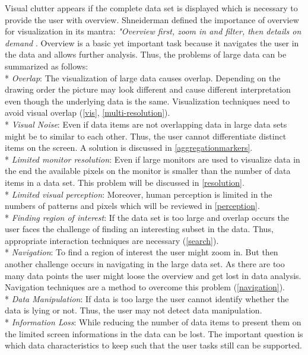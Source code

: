  Visual clutter appears if the complete data set is displayed which is necessary to provide the user with overview. Shneiderman defined the importance of overview for visualization in its mantra: \textit{"Overview first, zoom in and filter, then details on demand} \cite{paterno1997concurtasktrees, Shneiderman2008, Keim2008}. Overview is a basic yet important task because it navigates the user in the data and allows further analysis. Thus, the problems of large data can be summarized as follows: 
\\*
\textit{Overlap}: 
The visualization of large data causes overlap. Depending on the drawing order the picture may look different and cause different interpretation even though the underlying data is the same. Visualization techniques need to avoid visual overlap (\ref{vis}, \ref{multi-resolution}). 
\\*
\textit{Visual Noise}: 
Even if data items are not overlapping data in large data sets might be to similar to each other. Thus, the user cannot differentiate distinct items on the screen. A solution is discussed in \ref{aggregationmarkers}.
\\*
\textit{Limited monitor resolution}:
Even if large monitors are used to visualize data in the end the available pixels on the monitor is smaller than the number of data items in a data set. This problem will be discussed in \ref{resolution}.
\\*
\textit{Limited visual perception}:
Moreover, human perception is limited in the numbers of patterns and pixels which will be reviewed in \ref{perception}.
\\*
\textit{Finding region of interest}:
If the data set is too large and overlap occurs the user faces the challenge of finding an interesting subset in the data. Thus, appropriate interaction techniques are necessary (\ref{search}).
\\*
\textit{Navigation}:
To find a region of interest the user might zoom in. But then another challenge occurs in navigating in the large data set. As there are too many data points the user might loose the overview and get lost in data analysis. Navigation techniques are a method to overcome this problem (\ref{navigation}).
\\*
\textit{Data Manipulation}:
If data is too large the user cannot identify whether the data is lying or not. Thus, the user may not detect data manipulation.
\\*
\textit{Information Loss}:
While reducing the number of data items to present them on the limited screen informations in the data can be lost. The important question is which data characteristics to keep such that the user tasks still can be supported.
